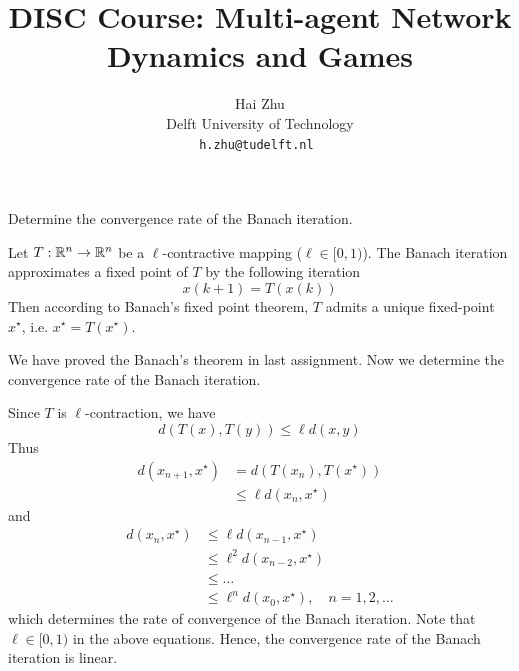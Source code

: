 \documentclass[a4 paper, 12pt]{article}
\title{
        \Large{DISC Course: Multi-agent Network Dynamics and Games}\\
        \vspace{1em}
        \large\tb{Assignment 2}
}
\author{
        \small Hai Zhu                          \\
        \small Delft University of Technology   \\
        \tt\small h.zhu@tudelft.nl
 }
\date{\small\ti{\today}}
\begin{document}
\maketitle


 Determine the convergence rate of the Banach iteration.

Let $T:\mathbb{R}^n \rightarrow \mathbb{R}^n$ be a $\ell$-contractive mapping ($\ell \in [0,1)$). The Banach iteration approximates a fixed point of $T$ by the following iteration 
\begin{equation}
        x(k+1) = T(x(k))
\end{equation}
Then according to Banach's fixed point theorem, $T$ admits a unique fixed-point $x^\star$, i.e. $x^\star = T(x^\star)$. 

We have proved the Banach's theorem in last assignment. Now we determine the convergence rate of the Banach iteration.

Since $T$ is $\ell$-contraction, we have 
\begin{equation}
        d(T(x), T(y)) \leq \ell d(x,y)
\end{equation}
Thus
\begin{equation}
        \begin{aligned}
                d(x_{n+1},x^\star) &= d(T(x_n),T(x^\star)) \\
                &\leq \ell d(x_n,x^\star)
        \end{aligned}
\end{equation}
and 
\begin{equation}
        \begin{aligned}
                d(x_n,x^\star) &\leq \ell d(x_{n-1},x^\star) \\
                &\leq \ell^2 d(x_{n-2},x^\star) \\ 
                &\leq \dots \\
                &\leq \ell^n d(x_{0},x^\star), \quad n=1,2,\dots
        \end{aligned}
\end{equation}
which determines the rate of convergence of the Banach iteration. Note that $\ell \in [0,1)$ in the above equations. Hence, the convergence rate of the Banach iteration is linear.



\end{document}
